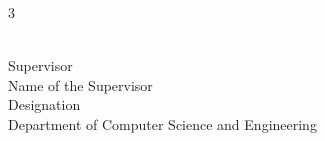 \documentclass{standalone}
\begin{document}
\begin{titlepage}
\begin{multicols}{3}
	\begin{flushleft}
		\hrulefill \\
		{\hspace{0.5mm}Supervisor\\\hspace{0.5mm}Name of the Supervisor\\
		\hspace{0.5mm}Designation \\\hspace{0.5mm}Department of Computer Science and Engineering}\\
		\end{flushleft}
\end{multicols}

\end{titlepage}
\end{document}
